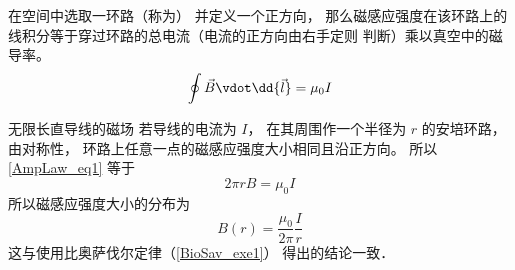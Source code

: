 
在空间中选取一环路（称为） 并定义一个正方向， 那么磁感应强度在该环路上的线积分等于穿过环路的总电流（电流的正方向由右手定则 判断）乘以真空中的磁导率。
\begin{equation}\label{AmpLaw_eq1}
\oint \vec B \vdot \dd{\vec l} = \mu_0 I
\end{equation}

\begin{exam}{无限长直导线的磁场}
若导线的电流为 $I$， 在其周围作一个半径为 $r$ 的安培环路， 由对称性， 环路上任意一点的磁感应强度大小相同且沿正方向。 所以\autoref{AmpLaw_eq1} 等于
\begin{equation}
2\pi r B = \mu_0 I
\end{equation}
所以磁感应强度大小的分布为
\begin{equation}
B(r) = \frac{\mu_0}{2\pi} \frac Ir
\end{equation}
这与使用比奥萨伐尔定律（\autoref{BioSav_exe1}） 得出的结论一致．
\end{exam}